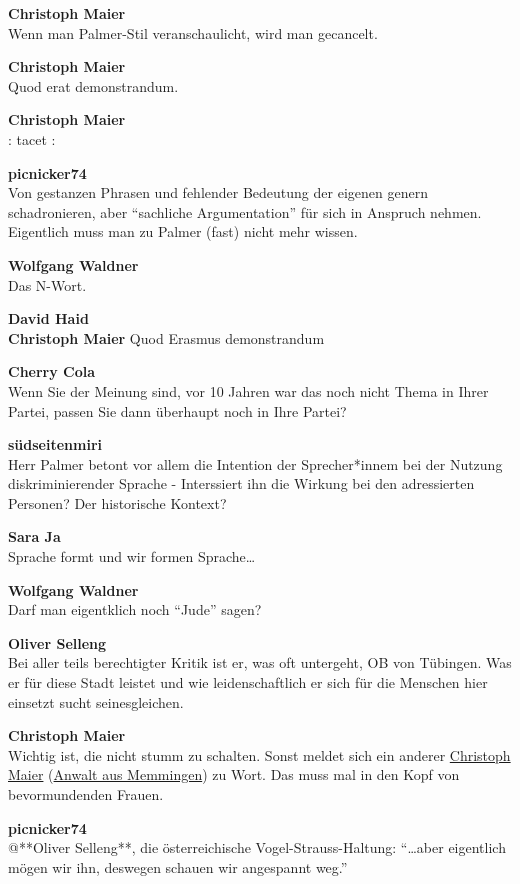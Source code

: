 \documentclass[]{article}
\begin{document}
\textbf{Christoph Maier}\\
​Wenn man Palmer-Stil veranschaulicht, wird man gecancelt.

\textbf{Christoph Maier}\\
​Quod erat demonstrandum.

\textbf{Christoph Maier}\\
​\textbar{}\textbar{}: tacet :\textbar{}\textbar{}

\textbf{picnicker74}\\
​Von gestanzen Phrasen und fehlender Bedeutung der eigenen genern
schadronieren, aber ``sachliche Argumentation'' für sich in Anspruch
nehmen. Eigentlich muss man zu Palmer (fast) nicht mehr wissen.

\textbf{Wolfgang Waldner}\\
​Das N-Wort. 🙂

\textbf{David Haid}\\
​\textbf{Christoph Maier} Quod Erasmus demonstrandum

\textbf{Cherry Cola}\\
​Wenn Sie der Meinung sind, vor 10 Jahren war das noch nicht Thema in
Ihrer Partei, passen Sie dann überhaupt noch in Ihre Partei?

\textbf{südseitenmiri}\\
​Herr Palmer betont vor allem die Intention der Sprecher*innem bei der
Nutzung diskriminierender Sprache - Interssiert ihn die Wirkung bei den
adressierten Personen? Der historische Kontext?

\textbf{Sara Ja}\\
​Sprache formt und wir formen Sprache\ldots{}

\textbf{Wolfgang Waldner}\\
​Darf man eigentklich noch ``Jude'' sagen?

\textbf{Oliver Selleng}\\
​Bei aller teils berechtigter Kritik ist er, was oft untergeht, OB von
Tübingen. Was er für diese Stadt leistet und wie leidenschaftlich er
sich für die Menschen hier einsetzt sucht seinesgleichen.

\textbf{Christoph Maier}\\
​Wichtig ist, die nicht stumm zu schalten. Sonst meldet sich ein anderer
\protect\hyperlink{Christoph-Maier-MdL}{Christoph Maier}
(\protect\hyperlink{Anwalt}{Anwalt aus Memmingen}) zu Wort. Das muss mal
in den Kopf von bevormundenden Frauen.

\textbf{picnicker74}\\
​@**Oliver Selleng**, die österreichische Vogel-Strauss-Haltung:
``\ldots{}aber eigentlich mögen wir ihn, deswegen schauen wir angespannt
weg.''
\end{document}
